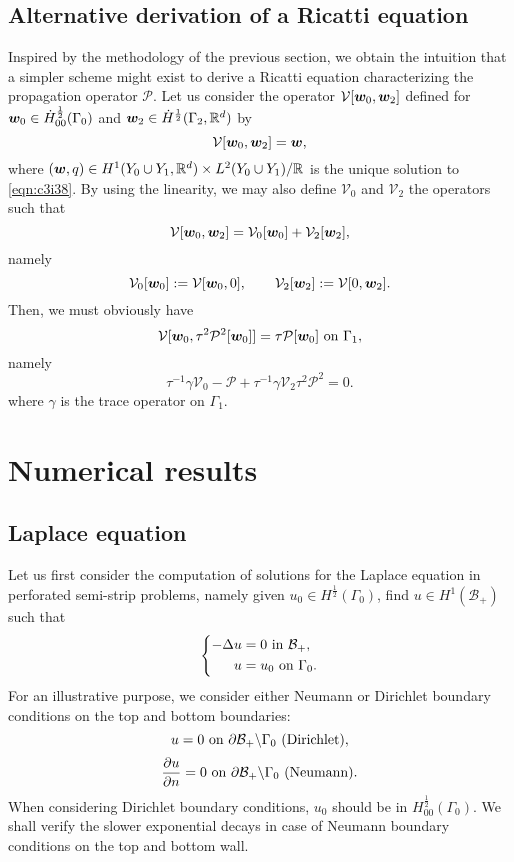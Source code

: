 \documentclass[a4paper,10pt,reqno]{amsart}
\begin{document}
\subsection{Alternative derivation of a Ricatti equation}
Inspired by the methodology of the previous section, we obtain the intuition that
a simpler scheme might exist to derive a Ricatti equation characterizing the
propagation operator $\mathcal{P}$. Let us consider the operator
$\mathcal{V}[{\bm w}_0,{\bm w}_2]$ defined for ${\bm w}_0\in \dot{H}^{\frac{1}{2}}_{00}(\Gamma_0)$ and ${\bm w}_2\in \dot
H^{\frac{1}{2}}(\Gamma_2,\mathbb{R}^{d})$ by    
\begin{equation}
\label{eqn:88eqm}   
\mathcal{V}[{\bm w}_0,{\bm w}_2]={\bm w},
\end{equation}  
where $({\bm w},q)\in H^{1}(Y_0\cup Y_1,\mathbb{R}^{d})\times L^{2}(Y_0\cup Y_1)/\mathbb{R}$ is the unique solution to \cref{eqn:c3i38}. 
By using the linearity, we may also define $\mathcal{V}_0$ and $\mathcal{V}_2$ the operators such that  
\[
    \mathcal{V}[{\bm w}_0,{\bm w}_2]=\mathcal{V}_0[{\bm w}_0]+\mathcal{V}_2[{\bm w}_2],
\]
namely  
\[
    \mathcal{V}_0[{\bm w}_0]:=\mathcal{V}[{\bm w}_0,0],\qquad
    \mathcal{V}_2[{\bm w}_2]:=\mathcal{V}[0,{\bm w}_2].
\] 
Then, we must obviously have    
\[
    \mathcal{V}[\w_0,\tau^{2}\mathcal{P}^{2}[\w_0]]=\tau\mathcal{P} [\w_0] \On \Gamma_1,
\] 
namely  
\begin{equation}
\label{eqn:0hn7g}
\tau^{-1}\gamma\mathcal{V}_0-\mathcal{P}+\tau^{-1}\gamma\mathcal{V}_2\tau^{2} \mathcal{P}^{2}=0.
\end{equation}
where $\gamma$ is the trace operator on $\Gamma_1$.
\section{Numerical results} 
\subsection{Laplace equation}   
Let us first consider the computation of solutions for the Laplace equation in
perforated semi-strip problems, namely  given $u_0\in
H^{\frac{1}{2}}(\Gamma_0)$,    
find $u\in H^{1}(\mathcal{B}_+)$ such that
\begin{equation}
\label{eqn:q7aj0}   
\left\{\begin{aligned}
        -\Delta u &= 0 \textrm{ in } \mathcal{B}_+,\\ 
        u &= u_0 \textrm{ on } \Gamma_0.
\end{aligned}
\right.
\end{equation}
For an illustrative purpose, we consider either Neumann or Dirichlet boundary
conditions on the top and bottom boundaries:    
\begin{equation}
\label{eqn:4cxg3}
        u = 0 \textrm{ on } \partial \mathcal{B}_+\backslash \Gamma_0 \text{ (Dirichlet)},
\end{equation}
\begin{equation}
\label{eqn:4e0hf}
    \frac{\partial u}{\partial n} = 0 \textrm{ on } \partial \mathcal{B}_+\backslash \Gamma_0 \text{ (Neumann)}.
\end{equation}
When considering Dirichlet boundary conditions, $u_0$ should be in
$H^{\frac{1}{2}}_{00}(\Gamma_0)$. We shall verify the slower exponential decays in case of
Neumann boundary conditions on the top and bottom wall. 
    
\end{document}
